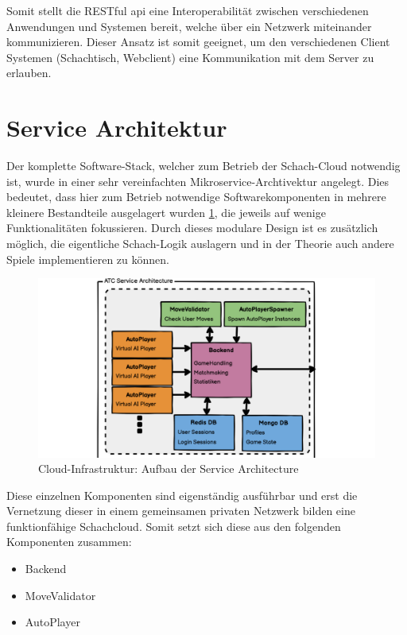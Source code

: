 Somit stellt die RESTful \gls{api} eine Interoperabilität zwischen
verschiedenen Anwendungen und Systemen bereit, welche über ein Netzwerk
miteinander kommunizieren. Dieser Ansatz ist somit geeignet, um den
verschiedenen Client Systemen (Schachtisch, Webclient) eine
Kommunikation mit dem Server zu erlauben.

\hypertarget{service-architektur}{%
\section{Service Architektur}\label{service-architektur}}

Der komplette Software-Stack, welcher zum Betrieb der Schach-Cloud
notwendig ist, wurde in einer sehr vereinfachten
Mikroservice-Archtivektur angelegt. Dies bedeutet, dass hier zum Betrieb
notwendige Softwarekomponenten in mehrere kleinere Bestandteile
ausgelagert wurden \ref{ATC_Service_Architecture}, die jeweils auf
wenige Funktionalitäten fokussieren. Durch dieses modulare Design ist es
zusätzlich möglich, die eigentliche Schach-Logik auslagern und in der
Theorie auch andere Spiele implementieren zu können.

\begin{figure}
\centering
\includegraphics{images/ATC_Service_Architecture.png}
\caption{Cloud-Infrastruktur: Aufbau der Service Architecture
\label{ATC_Service_Architecture}}
\end{figure}

Diese einzelnen Komponenten sind eigenständig ausführbar und erst die
Vernetzung dieser in einem gemeinsamen privaten Netzwerk bilden eine
funktionfähige Schachcloud. Somit setzt sich diese aus den folgenden
Komponenten zusammen:

\begin{itemize}
\tightlist
\item
  Backend
\item
  MoveValidator
\item
  AutoPlayer
\end{itemize}


